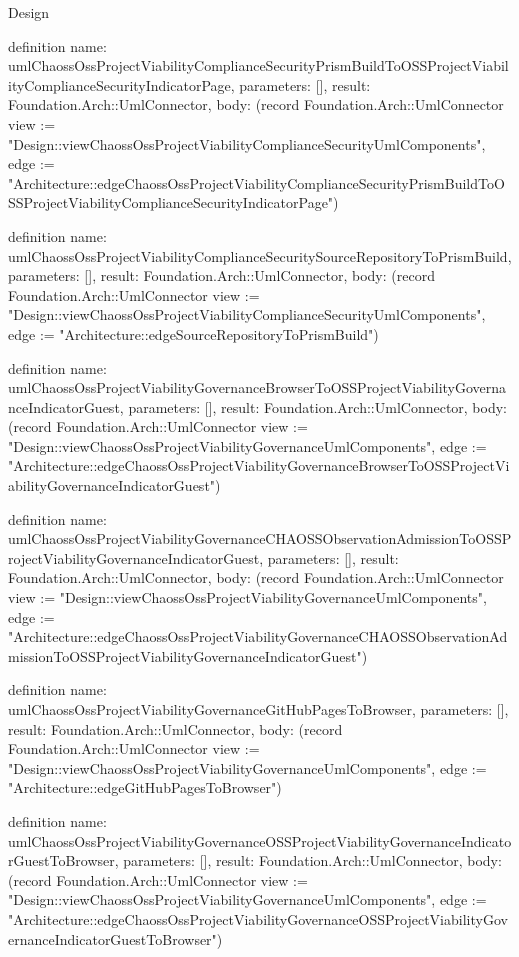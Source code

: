 \begin{lexlean}{Design}
\begin{semanticmodule}
definition{
  name: umlChaossOssProjectViabilityComplianceSecurityPrismBuildToOSSProjectViabilityComplianceSecurityIndicatorPage,
  parameters: [],
  result: Foundation.Arch::UmlConnector,
  body: (record Foundation.Arch::UmlConnector {view := "Design::viewChaossOssProjectViabilityComplianceSecurityUmlComponents", edge := "Architecture::edgeChaossOssProjectViabilityComplianceSecurityPrismBuildToOSSProjectViabilityComplianceSecurityIndicatorPage"})
}

definition{
  name: umlChaossOssProjectViabilityComplianceSecuritySourceRepositoryToPrismBuild,
  parameters: [],
  result: Foundation.Arch::UmlConnector,
  body: (record Foundation.Arch::UmlConnector {view := "Design::viewChaossOssProjectViabilityComplianceSecurityUmlComponents", edge := "Architecture::edgeSourceRepositoryToPrismBuild"})
}

definition{
  name: umlChaossOssProjectViabilityGovernanceBrowserToOSSProjectViabilityGovernanceIndicatorGuest,
  parameters: [],
  result: Foundation.Arch::UmlConnector,
  body: (record Foundation.Arch::UmlConnector {view := "Design::viewChaossOssProjectViabilityGovernanceUmlComponents", edge := "Architecture::edgeChaossOssProjectViabilityGovernanceBrowserToOSSProjectViabilityGovernanceIndicatorGuest"})
}

definition{
  name: umlChaossOssProjectViabilityGovernanceCHAOSSObservationAdmissionToOSSProjectViabilityGovernanceIndicatorGuest,
  parameters: [],
  result: Foundation.Arch::UmlConnector,
  body: (record Foundation.Arch::UmlConnector {view := "Design::viewChaossOssProjectViabilityGovernanceUmlComponents", edge := "Architecture::edgeChaossOssProjectViabilityGovernanceCHAOSSObservationAdmissionToOSSProjectViabilityGovernanceIndicatorGuest"})
}

definition{
  name: umlChaossOssProjectViabilityGovernanceGitHubPagesToBrowser,
  parameters: [],
  result: Foundation.Arch::UmlConnector,
  body: (record Foundation.Arch::UmlConnector {view := "Design::viewChaossOssProjectViabilityGovernanceUmlComponents", edge := "Architecture::edgeGitHubPagesToBrowser"})
}

definition{
  name: umlChaossOssProjectViabilityGovernanceOSSProjectViabilityGovernanceIndicatorGuestToBrowser,
  parameters: [],
  result: Foundation.Arch::UmlConnector,
  body: (record Foundation.Arch::UmlConnector {view := "Design::viewChaossOssProjectViabilityGovernanceUmlComponents", edge := "Architecture::edgeChaossOssProjectViabilityGovernanceOSSProjectViabilityGovernanceIndicatorGuestToBrowser"})
}


\end{semanticmodule}
\end{lexlean}
